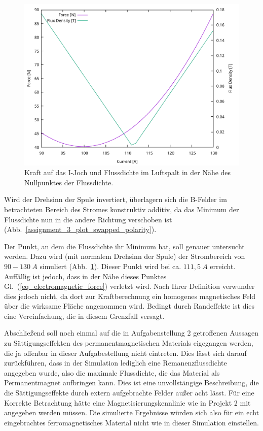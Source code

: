 \documentclass[conference,a4paper,twoside]{IEEEtran}
\begin{document}
\begin{figure}
\centerline{\includegraphics[width=\columnwidth]{../assets/assignment_3_plot_zero.pdf}}
\caption{Kraft auf das I-Joch und Flussdichte im Luftspalt in der Nähe des Nullpunktes der Flussdichte.}
\label{assignment_3_plot_zero}
\end{figure}

Wird der Drehsinn der Spule invertiert, überlagern sich die B-Felder im betrachteten Bereich des Stromes konstruktiv additiv, da das Minimum der Flussdichte nun in die andere Richtung verschoben ist (Abb.~\ref{assignment_3_plot_swapped_polarity}).

Der Punkt, an dem die Flussdichte ihr Minimum hat, soll genauer untersucht werden. Dazu wird (mit normalem Drehsinn der Spule) der Strombereich von $90 - 130\ A$ simuliert (Abb.~\ref{assignment_3_plot_zero}). Dieser Punkt wird bei ca. $111,5\ A$ erreicht. Auffällig ist jedoch, dass in der Nähe dieses Punktes Gl.~(\ref{eq_electromagnetic_force}) verletzt wird. Nach Ihrer Definition verwunder dies jedoch nicht, da dort zur Kraftberechnung ein homogenes magnetisches Feld über die wirksame Fläche angenommen wird. Bedingt durch Randeffekte ist dies eine Vereinfachung, die in diesem Grenzfall versagt.

Abschließend soll noch einmal auf die in Aufgabenstellung 2 getroffenen Aussagen zu Sättigungseffekten des permanentmagnetischen Materials eigegangen werden, die ja offenbar in dieser Aufgabestellung nicht eintreten. Dies lässt sich darauf zurückführen, dass in der Simulation lediglich eine Remanenzflussdichte angegeben wurde, also die maximale Flussdichte, die das Material als Permanentmagnet aufbringen kann. Dies ist eine unvollstängige Beschreibung, die die Sättigungseffekte durch extern aufgebrachte Felder außer acht lässt. Für eine Korrekte Betrachtung hätte eine Magnetisierungskennlinie wie in Projekt 2 mit angegeben werden müssen. Die simulierte Ergebnisse würden sich also für ein echt eingebrachtes ferromagnetisches Material nicht wie in dieser Simulation einstellen.
\end{document}

